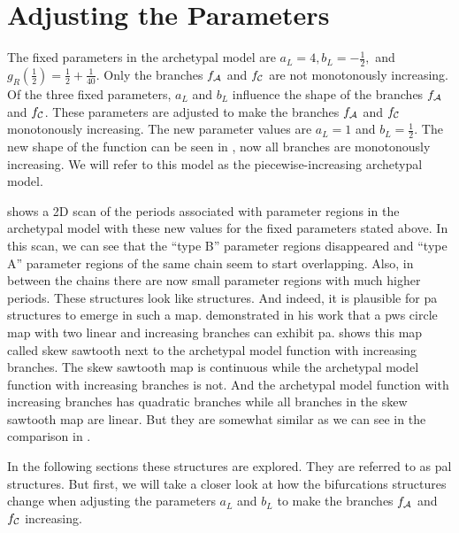 \section{Adjusting the Parameters}
\label{sec:add.parameters}

The fixed parameters in the archetypal model are $a_L = 4, b_L = -\frac{1}{2},$ and $g_R\left(\frac{1}{2}\right) = \frac{1}{2} + \frac{1}{40}$.
Only the branches $f_{\mathcal{A}}$ and $f_{\mathcal{C}}$ are not monotonously increasing.
Of the three fixed parameters, $a_L$ and $b_L$ influence the shape of the branches $f_{\mathcal{A}}$ and $f_{\mathcal{C}}$.
These parameters are adjusted to make the branches $f_{\mathcal{A}}$ and $f_{\mathcal{C}}$ monotonously increasing.
The new parameter values are $a_L = 1$ and $b_L = \frac{1}{2}$.
The new shape of the function can be seen in , now all branches are monotonously increasing.
We will refer to this model as the piecewise-increasing archetypal model.

 shows a 2D scan of the periods associated with parameter regions in the archetypal model with these new values for the fixed parameters stated above.
In this scan, we can see that the ``type B'' parameter regions disappeared and ``type A'' parameter regions of the same chain seem to start overlapping.
Also, in between the chains there are now small parameter regions with much higher periods.
These structures look like  structures.
And indeed, it is plausible for \gls{pa} structures to emerge in such a map.
 demonstrated in his work \cite{simpson2018saw} that a \gls{pws} circle map with two linear and increasing branches can exhibit \gls{pa}.
 shows this map called skew sawtooth next to the archetypal model function with increasing branches.
The skew sawtooth map is continuous while the archetypal model function with increasing branches is not.
And the archetypal model function with increasing branches has quadratic branches while all branches in the skew sawtooth map are linear.
But they are somewhat similar as we can see in the comparison in .

In the following sections these structures are explored.
They are referred to as \gls{pal} structures.
But first, we will take a closer look at how the bifurcations structures change when adjusting the parameters $a_L$ and $b_L$ to make the branches $f_{\mathcal{A}}$ and $f_{\mathcal{C}}$ increasing.

